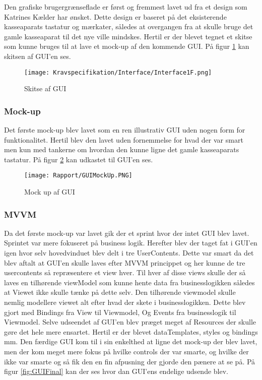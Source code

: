 Den grafiske brugergrænseflade er først og fremmest lavet ud fra et design som Katrines Kælder
har ønsket. Dette design er baseret på det eksisterende kasseaparats tastatur og mærkater, således
at overgangen fra at skulle bruge det gamle kasseaparat til det nye ville mindskes.
Hertil er der blevet tegnet et skitse som kunne bruges til at lave et mock-up af den kommende GUI. På figur \ref{fig:GUTskitse} kan skitsen af GUI'en ses.\newline

\begin{figure}[H]
\centering
	\texttt{[image: Kravspecifikation/Interface/Interface1F.png]}
	\caption{Skitse af GUI}
	\label{fig:GUTskitse}
\end{figure}

\subsubsection{Mock-up}
Det første mock-up blev lavet som en ren illustrativ GUI uden nogen form for funktionalitet. Hertil
blev den lavet uden fornemmelse for hvad der var smart men kun med tankerne om hvordan den
kunne ligne det gamle kasseaparats tastatur. På figur \ref{fig:GUIMock} kan udkastet til GUI'en ses.
\begin{figure}[H]
\centering
	\texttt{[image: Rapport/GUIMockUp.PNG]}
	\caption{Mock up af GUI}
	\label{fig:GUIMock}
\end{figure}
\subsubsection{MVVM}
Da det første mock-up var lavet gik der et sprint hvor der intet GUI blev lavet. Sprintet var mere fokuseret på business logik. Herefter blev der taget fat i GUI’en igen hvor selv hovedvinduet blev delt i tre
UserContents. Dette var smart da det blev aftalt at GUI’en skulle laves efter MVVM princippet
og her kunne de tre usercontents så repræsentere et view hver. Til hver af disse views skulle der så
laves en tilhørende viewModel som kunne hente data fra businesslogikken således at Viewet ikke
skulle tænke på dette selv. Den tilhørende viewmodel skulle nemlig modellere viewet alt efter hvad
der skete i businesslogikken. Dette blev gjort med Bindings fra View til Viewmodel, Og Events fra
businesslogik til Viewmodel.
Selve udseendet af GUI’en blev præget meget af Resources der skulle gøre det hele mere ensartet.
Hertil er der blevet dataTemplates, styles og bindings mm.
Den færdige GUI kom til i sin enkelthed at ligne det mock-up der blev lavet, men der kom meget
mere fokus på hvilke controls der var smarte, og hvilke der ikke var smarte og så fik den en fin
afpusning der gjorde den pænere at se på. På figur \ref{fig:GUIFinal} kan der ses hvor dan GUI'ens endelige udsende blev.

